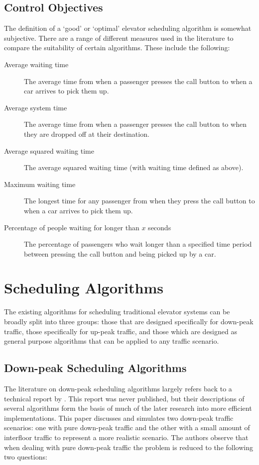 \documentclass{UoYCSproject}
\begin{document}
\subsection{Control Objectives}

The definition of a `good' or `optimal' elevator scheduling algorithm is somewhat subjective.  There are a range of different measures used in the literature to compare the suitability of certain algorithms.  These include the following:  \citep{Bao1994, Nikovski2003}

\begin{description}
	\item[Average waiting time] The average time from when a passenger presses the call button to when a car arrives to pick them up.
	\item[Average system time] The average time from when a passenger presses the call button to when they are dropped off at their destination.
	\item[Average squared waiting time] The average squared waiting time (with waiting time defined as above).
	\item[Maximum waiting time] The longest time for any passenger from when they press the call button to when a car arrives to pick them up.
	\item[Percentage of people waiting for longer than $x$ seconds] The percentage of passengers who wait longer than a specified time period between pressing the call button and being picked up by a car.
\end{description}

\section{Scheduling Algorithms}

The existing algorithms for scheduling traditional elevator systems can be broadly split into three groups: those that are designed specifically for down-peak traffic, those specifically for up-peak traffic, and those which are designed as general purpose algorithms that can be applied to any traffic scenario.

\subsection{Down-peak Scheduling Algorithms}

The literature on down-peak scheduling algorithms largely refers back to a technical report by \citet{Bao1994}.  This report was never published, but their descriptions of several algorithms form the basis of much of the later research into more efficient implementations.  This paper discusses and simulates two down-peak traffic scenarios: one with pure down-peak traffic and the other with a small amount of interfloor traffic to represent a more realistic scenario.  The authors observe that when dealing with pure down-peak traffic the problem is reduced to the following two questions:
\end{document}
